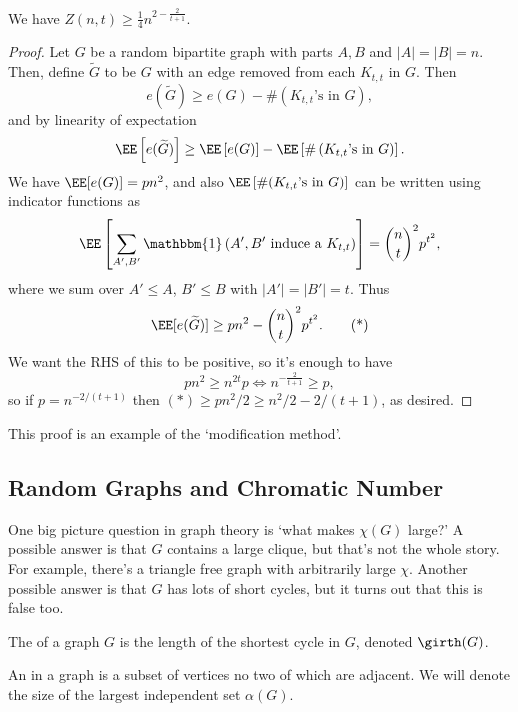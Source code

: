 \documentclass[a4paper]{scrartcl}
\begin{document}
\begin{theorem}
	We have $Z(n, t) \geq \frac{1}{4}n^{2 - \frac{2}{t + 1}}$.
\end{theorem}
\begin{proof}
	Let $G$ be a random bipartite graph with parts $A, B$ and $|A| = |B| = n$.
	Then, define $\widetilde{G}$ to be $G$ with an edge removed from each $K_{t, t}$ in $G$.
	Then
	$$
	e(\widetilde{G}) \geq e(G) - \#\left(K_{t, t}\text{'s in $G$}\right),
	$$
	and by linearity of expectation
	$$
	\EE \left[e(\widetilde{G})\right] \geq \EE\left[e(G)\right] - \EE\left[\#\left(K_{t, t}\text{'s in $G$}\right)\right].
	$$
	We have $\EE[e(G)] = pn^2$, and also $\EE\left[\#(K_{t,t}\text{'s in $G$})\right]$ can be written using indicator functions as 
$$
	\EE\left[\sum_{A', B'} \mathbbm{1}\left(A', B' \text{ induce a $K_{t, t}$}\right)\right] = \binom{n}{t}^2 p^{t^2},
$$
where we sum over $A' \leq A$, $B' \leq B$ with $|A'| = |B'| = t$. Thus
\begin{equation}\label{eq:zar}
	\EE[e(\widetilde{G})] \geq pn^2 - \binom{n}{t}^2p^{t^2}.\tag{*}
\end{equation}
We want the RHS of this to be positive, so it's enough to have
$$
pn^2 \geq n^{2t}p \iff n^{-\frac{2}{t + 1}} \geq p,
$$
so if $p = n^{-2/(t + 1)}$ then $(*) \geq pn^2/2 \geq n^2/2 - 2/(t+1)$, as desired.
\end{proof}

This proof is an example of the `modification method'.

\subsection{Random Graphs and Chromatic Number}


One big picture question in graph theory is `what makes $\chi(G)$ large?'
A possible answer is that $G$ contains a large clique, but that's not the whole story. For example, there's a triangle free graph with arbitrarily large $\chi$. Another possible answer is that $G$ has lots of short cycles, but it turns out that this is false too.

\begin{definition}[Girth]
	The  of a graph $G$ is the length of the shortest cycle in $G$, denoted $\girth(G)$.
\end{definition}

\begin{definition}
	An  in a graph is a subset of vertices no two of which are adjacent. We will denote the size of the largest independent set $\alpha(G)$.
\end{definition}
\end{document}
